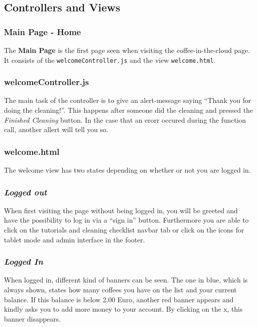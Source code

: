 \subsection{Controllers and Views}\label{controllers-and-views}

\subsubsection{Main Page - Home}\label{main-page---home}

The \textbf{Main Page} is the first page seen when visiting the
coffee-in-the-cloud page. It consists of the
\texttt{welcomeController.js} and the view \texttt{welcome.html}.

\subsubsection*{welcomeController.js}

The main task of the controller is to give an alert-message saying
``Thank you for doing the cleaning!''. This happens after someone did
the cleaning and pressed the \emph{Finished Cleaning} button. In the
case that an erorr occured during the function call, another allert will
tell you so.

\subsubsection*{welcome.html}

The welcome view has two states depending on whether or not you are
logged in.

\subsubsection*{\emph{Logged out}}

When first visiting the page without being logged in, you will be
greeted and have the possibility to log in via a ``sign in'' button.
Furthermore you are able to click on the tutorials and cleaning checklist
navbar tab or click on the icons for tablet mode and admin interface in
the footer.

\subsubsection*{\emph{Logged In}}

When logged in, different kind of banners can be seen. The one in blue,
which is always shown, states how many coffees you have on the list and
your current balance. If this balance is below 2.00 Euro, another red
banner appears and kindly asks you to add more money to your account. By
clicking on the x, this banner disappears.

